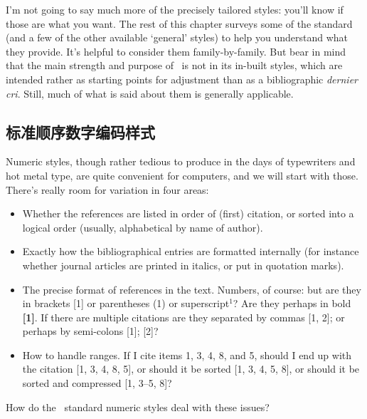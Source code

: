 I'm not going to say much more of the precisely tailored styles:
you'll know if those are what you want. 
The rest of this chapter
surveys some of the standard (and a few of the other available
`general' styles) to help you understand what they provide. It's
helpful to consider them family-by-family. But bear in mind that
the main strength and purpose of \biblatex\ is not in its in-built
styles, which are intended rather as starting points for adjustment
than as a bibliographic \emph{dernier cri}. Still, much of what is
said about them is generally applicable.

\subsection{标准顺序数字编码样式}

Numeric styles, though rather tedious to produce in the days of
typewriters and hot metal type, are quite convenient for computers,
and we will start with those. There's really room for variation in
four areas:
\begin{itemize}
\item Whether the references are listed in order of (first) citation,
  or sorted into a logical order (usually, alphabetical by name of
  author).
\item Exactly how the bibliographical entries are formatted internally
  (for instance whether journal articles are printed in italics, or
  put in quotation marks).
\item The precise format of references in the text. Numbers, of
  course: but are they in brackets [1] or parentheses (1) or
  superscript$^{1}$? Are they perhaps in bold \textbf{[1]}. If there
  are multiple citations are they separated by commas [1, 2]; or
  perhaps by semi-colons [1]; [2]?
\item How to handle ranges. If I cite items 1, 3, 4, 8, and 5, should
  I end up with the citation [1, 3, 4, 8, 5], or should it be sorted
  [1, 3, 4, 5, 8], or should it be sorted and compressed [1, 3--5, 8]?
\end{itemize}

How do the \biblatex\ standard numeric styles deal with these issues?

